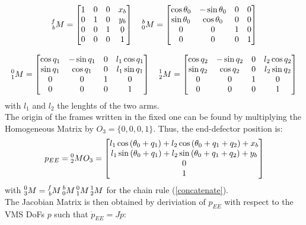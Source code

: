 \documentclass[a4paper,12pt,oneside]{report}
\begin{document}
\begin{equation}
  \begin{array}{c}
    \prescript{f}{b}{M}=\begin{bmatrix}
      1&0&0&x_b\\
    0&1&0&y_b\\
    0&0&1&0\\
    0&0&0&1
    \end{bmatrix}\quad
    \prescript{b}{0}{M}=\begin{bmatrix}
      \cos{\theta_0}&-\sin{\theta_0}&0&0\\
      \sin{\theta_0}&\cos{\theta_0}&0&0\\
      0&0&1&0\\
      0&0&0&1
    \end{bmatrix}\\ \\
    \prescript{0}{1}{M}=\begin{bmatrix}
      \cos{q_1}&-\sin{q_1}&0&l_1\cos{q_1}\\
      \sin{q_1}&\cos{q_1}&0&l_1\sin{q_1}\\
      0&0&1&0\\
      0&0&0&1
    \end{bmatrix}\quad
    \prescript{1}{2}{M}=\begin{bmatrix}
      \cos{q_2}&-\sin{q_2}&0&l_2\cos{q_2}\\
      \sin{q_2}&\cos{q_2}&0&l_2\sin{q_2}\\
      0&0&1&0\\
      0&0&0&1
    \end{bmatrix}
  \end{array}
\end{equation}
with $l_1$ and $l_2$ the lenghts of the two arms.\\
The origin of the frames written in the fixed one can be found by multiplying the Homogeneous Matrix by $O_3=\{0,0,0,1\}$. Thus, the end-defector position is:
\begin{equation}
  p_{EE}=\prescript{0}{2}{M}O_3= \begin{bmatrix}
    l_1\cos{(\theta_0+q_1)}+l_2\cos{(\theta_0+q_1+q_2)}+x_b\\
    l_1\sin{(\theta_0+q_1)}+l_2\sin{(\theta_0+q_1+q_2)}+y_b\\0\\1
   \end{bmatrix}
   \label{EE_position}
\end{equation}
with $\prescript{0}{3}{M}=\prescript{f}{b}{M}\prescript{b}{0}{M}\prescript{0}{1}{M}\prescript{1}{2}{M}$ for the chain rule (\ref{concatenate}).\\
The Jacobian Matrix is then obtained by deriviation of $p_{EE}$ with respect to the VMS DoFs $p$ such that $\dot{p}_{EE}=J\dot{p}$:
\end{document}
